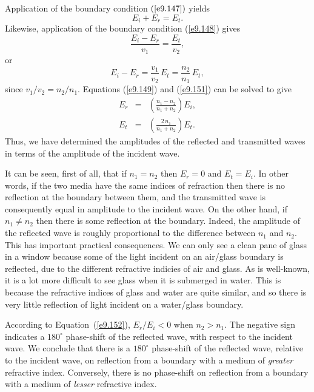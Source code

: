 Application of the boundary condition $(\ref{e9.147})$ yields
\begin{equation}\label{e9.149}
E_i + E_r = E_t.
\end{equation}
Likewise, application of the boundary condition (\ref{e9.148}) gives
\begin{equation}
\frac{E_i - E_r}{v_1} = \frac{E_t}{v_2},
\end{equation}
or
\begin{equation}\label{e9.151}
E_i - E_r = \frac{v_1}{v_2}\,E_t = \frac{n_2}{n_1}\,E_t,
\end{equation}
since $v_1/v_2=n_2/n_1$.
Equations (\ref{e9.149}) and (\ref{e9.151}) can be solved to give
\begin{eqnarray}\label{e9.152}
E_r &=& \left(\frac{n_1-n_2}{n_1+n_2}\right) E_i,\\[0.5ex]
E_t &=& \left(\frac{2\, n_1}{n_1+n_2}\right) E_t.\label{e9.153}
\end{eqnarray}
Thus, we have determined the amplitudes of the reflected and transmitted
waves in terms of the amplitude of the incident wave.

It can be seen, first of all, that if $n_1=n_2$ then $E_r=0$ and $E_t=E_i$.
In other words, if the two media have the same indices of refraction then
there is no reflection  at the boundary between them, and the transmitted
wave is consequently equal in amplitude to the incident wave. On the other
hand, if $n_1\neq n_2$ then there is some reflection at the boundary. Indeed,
the amplitude of the reflected wave is roughly proportional to the difference between $n_1$ and $n_2$. This has  important practical consequences.
We can only see a clean pane of glass in a window because some of the light incident
on an air/glass boundary is reflected, due to the different refractive indicies
of air and glass. As is well-known, it is a lot more difficult to see glass when it is submerged in water. This is because the refractive indices of glass and water are quite similar, and so there is very little reflection of light
incident on a water/glass boundary.

According to Equation~(\ref{e9.152}), $E_r/E_i<0$ when $n_2> n_1$. 
The negative sign indicates a $180^\circ$ phase-shift of the reflected wave, with
respect to the incident wave. We conclude that there is a $180^\circ$ phase-shift of the reflected wave, relative to the incident wave, on reflection from a boundary with a
medium of {\em greater} refractive index. Conversely, there is no 
 phase-shift
on reflection from a boundary with a medium of {\em lesser} refractive index.

